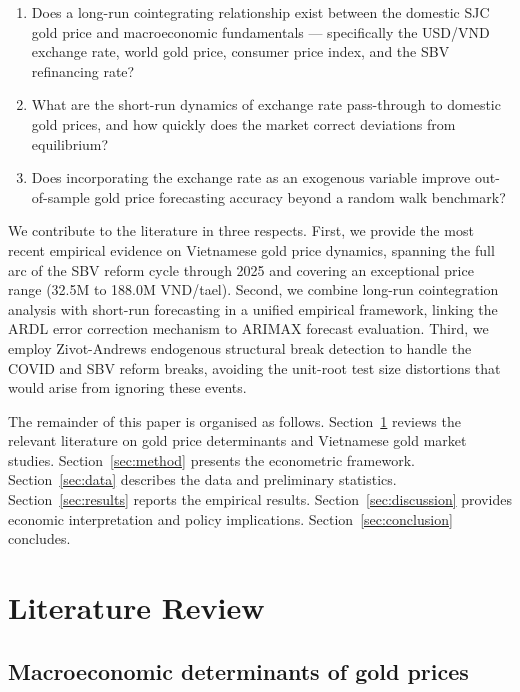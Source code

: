 \documentclass[12pt,a4paper]{article}
\begin{document}
\begin{enumerate}
  \item Does a long-run cointegrating relationship exist between the
        domestic SJC gold price and macroeconomic fundamentals ---
        specifically the USD/VND exchange rate, world gold price,
        consumer price index, and the SBV refinancing rate?
  \item What are the short-run dynamics of exchange rate pass-through
        to domestic gold prices, and how quickly does the market
        correct deviations from equilibrium?
  \item Does incorporating the exchange rate as an exogenous variable
        improve out-of-sample gold price forecasting accuracy beyond
        a random walk benchmark?
\end{enumerate}

We contribute to the literature in three respects.
First, we provide the most recent empirical evidence on Vietnamese gold price
dynamics, spanning the full arc of the SBV reform cycle through 2025 and
covering an exceptional price range (32.5M to 188.0M VND/tael).
Second, we combine long-run cointegration analysis with short-run forecasting
in a unified empirical framework, linking the ARDL error correction mechanism
to ARIMAX forecast evaluation.
Third, we employ Zivot-Andrews endogenous structural break detection to handle
the COVID and SBV reform breaks, avoiding the unit-root test size distortions
that would arise from ignoring these events.

The remainder of this paper is organised as follows.
Section~\ref{sec:lit} reviews the relevant literature on gold price determinants
and Vietnamese gold market studies.
Section~\ref{sec:method} presents the econometric framework.
Section~\ref{sec:data} describes the data and preliminary statistics.
Section~\ref{sec:results} reports the empirical results.
Section~\ref{sec:discussion} provides economic interpretation and policy
implications. Section~\ref{sec:conclusion} concludes.

\section{Literature Review}
\label{sec:lit}

\subsection{Macroeconomic determinants of gold prices}
\end{document}
